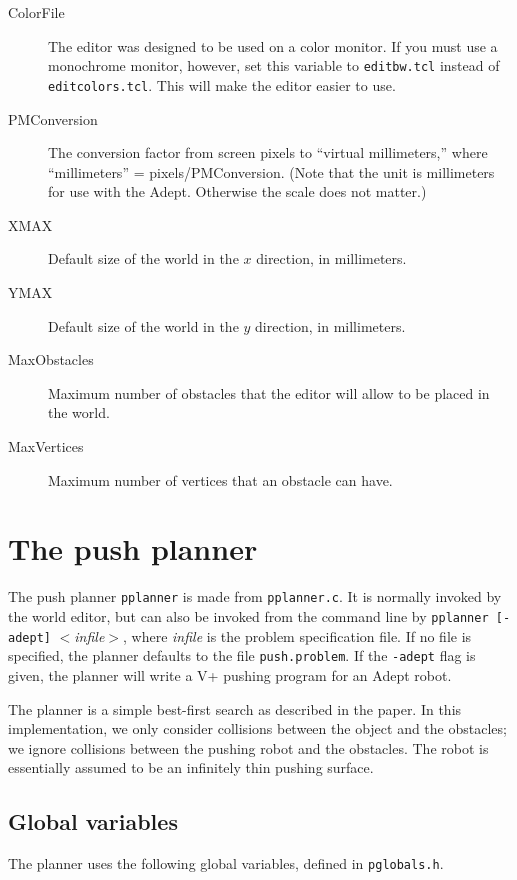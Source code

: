\begin{description}
\item[ColorFile]  The editor was designed to be used on a color monitor.
If you must use a monochrome monitor, however, set this variable to
{\tt editbw.tcl} instead of {\tt editcolors.tcl}.  This will make the editor
easier to use.
\item[PMConversion]  The conversion factor from screen pixels to ``virtual
millimeters,'' where ``millimeters'' = pixels/PMConversion.  
(Note that the unit is millimeters for use with the Adept.  Otherwise
the scale does not matter.)
\item[XMAX]  Default size of the world in the $x$ direction, in millimeters.
\item[YMAX]  Default size of the world in the $y$ direction, in millimeters.
\item[MaxObstacles]  Maximum number of obstacles that the editor will
allow to be placed in the world.
\item[MaxVertices]  Maximum number of vertices that an obstacle can have.
\end{description}

\section{The push planner}

The push planner {\tt pplanner} is made from {\tt pplanner.c}.
It is normally invoked by the world editor, but can also be
invoked from the command line by {\tt pplanner [-adept]} {\em $<$infile$>$},
where {\em infile\/} is the problem specification file.  If no
file is specified, the planner defaults to the file {\tt push.problem}.
If the {\tt -adept} flag is given, the planner will write a V+ pushing
program for an Adept robot.

The planner is a simple best-first search as described in the paper.
In this implementation, we only consider collisions between the 
object and the obstacles; we ignore collisions between the pushing
robot and the obstacles.  The robot is essentially assumed to be
an infinitely thin pushing surface.

\subsection{Global variables}

The planner uses the following global variables, defined in 
{\tt pglobals.h}.


